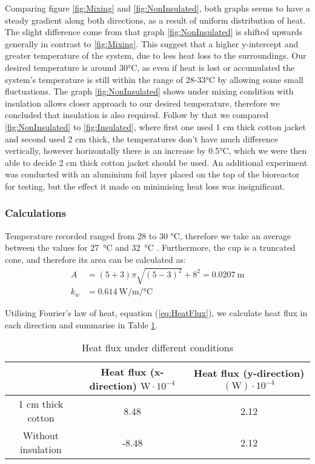 Comparing figure \ref{fig:Mixing} and \ref{fig:NonInsulated}, both graphs seems to have a steady gradient along both directions, as a result of uniform distribution of heat. The slight difference come from that graph \ref{fig:NonInsulated} is shifted upwards generally in contrast to \ref{fig:Mixing}. This suggest that a higher y-intercept and greater temperature of the system, due to less heat loss to the surroundings. Our desired temperature is around 30\si{\celsius}, as even if heat is lost or accumulated the system’s temperature is still within the range of 28-33\si{\celsius} by allowing some small fluctuations. The graph \ref{fig:NonInsulated} shows under mixing condition with insulation allows closer approach to our desired temperature, therefore we concluded that insulation is also required. Follow by that we compared \ref{fig:NonInsulated} to \ref{fig:Insulated}, where first one used 1 cm thick cotton jacket and second used 2 cm thick, the temperatures don’t have much difference vertically, however horizontally there is an increase by 0.5\si{\celsius}, which we were then able to decide 2 cm thick cotton jacket should be used. An additional experiment was conducted with an aluminium foil layer placed on the top of the bioreactor for testing, but the effect it made on minimising heat loss was insignificant.

\subsubsection{Calculations}
Temperature recorded ranged from 28 to 30 \si{\celsius}, therefore we take an average between the values for \SI{27}{\celsius} and \SI{32}{\celsius} \cite{doi:10.1063/1.555963}. Furthermore, the cup is a truncated cone, and therefore its area can be calculated as:
\begin{equation}
    \begin{split}
        A &= (5+3)\pi \sqrt{{(5-3)}^2} + 8^2 = \SI{0.0207}{\meter} \\
        k_w &= \SI{0.614}{\watt\per\meter\per\celsius}
    \end{split}
\end{equation}

Utilising Fourier's law of heat, equation (\ref{eq:HeatFlux}), we calculate heat flux in each direction and summarise in Table \ref{tb:HeatFlux}.

\begin{table}
    \begin{tabular}{c c c}
        \toprule
         & Heat flux (x-direction) $\si{\watt} \cdot 10^{-4}$ & Heat flux (y-direction) $(\si{\watt}) \cdot 10^{-4}$ \\
        \midrule
        1 cm thick cotton	&	8.48	&	2.12	\\
        Without insulation	&	-8.48	&	2.12	\\
        \bottomrule
    \end{tabular}
    \caption{Heat flux under different conditions}
    \label{tb:HeatFlux}
\end{table}

